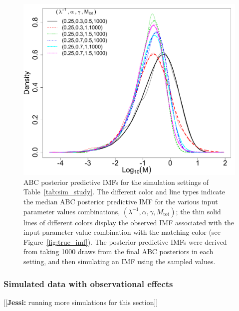 \documentclass[12pt]{article}
\newcommand{\jessi}[1]{{\color{blue}[[\textbf{Jessi: }#1]]}}
\newcommand{\Mtot}{M_{\text{tot}}}
\begin{document}
\begin{figure}[htbp]
   \centering
\includegraphics[width = .5\textwidth]{figures/sim_study_imf_combined.pdf} 
   \caption{ABC posterior predictive IMFs for the simulation settings of Table~\ref{tab:sim_study}.  The different color and line types indicate the median ABC posterior predictive IMF for the various input parameter values combinations, $(\lambda^{-1}, \alpha, \gamma, \Mtot)$; the thin solid lines of different colors display the observed IMF associated with the input parameter value combination with the matching color (see Figure~\ref{fig:true_imf}).
The posterior predictive IMFs were derived from taking 1000 draws from the final ABC posteriors in each setting, and then simulating an IMF using the sampled values. 
   }
   \label{fig:abc_pa_imf}
\end{figure}

\subsubsection{Simulated data with observational effects}

\jessi{running more simulations for this section}
\end{document}
